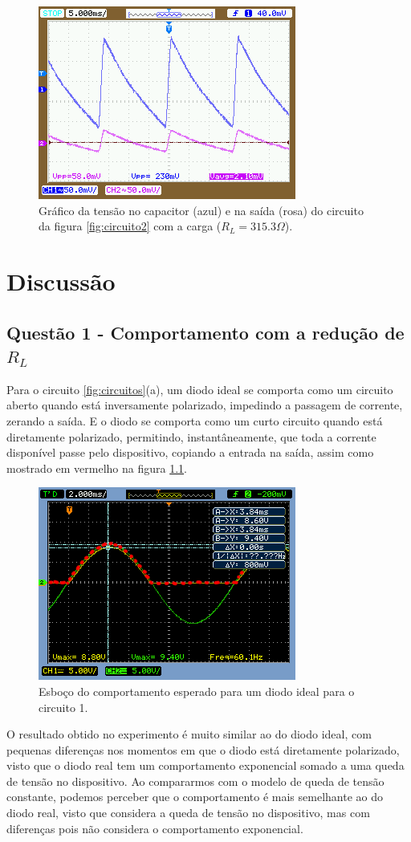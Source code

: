 \documentclass{abntex2}
\begin{document}
\begin{figure}[h]
  \centering
  \includegraphics[scale = 0.7]{exp2-5.png}
  \caption{Gráfico da tensão no capacitor (azul) e na saída (rosa) do circuito da figura \ref{fig:circuito2} com a carga ($R_L = 315.3\Omega$).}
  \label{fig:graf5}
\end{figure}
\pagebreak
\chapter{Discussão}

\section{Questão 1 - Comportamento com a redução de $R_L$}
Para o circuito \ref{fig:circuitos}(a), um diodo ideal se comporta como um circuito aberto quando está inversamente polarizado, impedindo a passagem de corrente, zerando a saída. E o diodo se comporta como um curto circuito quando está diretamente polarizado,
permitindo, instantâneamente, que toda a corrente disponível passe pelo dispositivo, copiando a entrada na saída, assim como mostrado em vermelho na figura \ref{fig:comp1}.

\begin{figure}[h]
  \centering
  \includegraphics[scale = .7]{circuito-1a-esboco.png}
  \caption{Esboço do comportamento esperado para um diodo ideal para o circuito 1.}
  \label{fig:comp1}
\end{figure}
\pagebreak
O resultado obtido no experimento é muito similar ao do diodo ideal, com pequenas diferenças nos momentos em que o diodo está diretamente polarizado, visto que o diodo real tem um comportamento exponencial somado a uma queda de tensão no dispositivo.
Ao compararmos com o modelo de queda de tensão constante, podemos perceber que o comportamento é mais semelhante ao do diodo real, visto que considera a queda de tensão no dispositivo, mas com diferenças pois não considera o comportamento exponencial.
\end{document}
